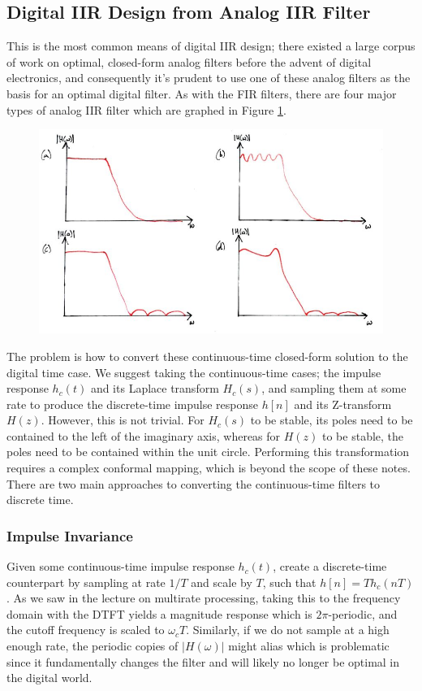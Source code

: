 \subsection{Digital IIR Design from Analog IIR Filter}
%
This is the most common means of digital IIR design; there existed a large
corpus of work on optimal, closed-form analog filters before the advent of digital
electronics, and consequently it's prudent to use one of these analog
filters as the basis for an optimal digital filter. As with the
FIR filters, there are four major types of analog IIR filter which are
graphed in Figure \ref{fig::lecture_18_analog_filters}.\\
%
\begin{figure}[!htb]
  \includegraphics[width=\textwidth]{images/lecture_18_analog_filters.JPG}
  \caption{
  }
  \label{fig::lecture_18_analog_filters}
\end{figure}
%
The problem is how to convert these continuous-time closed-form solution to
the digital time case. We suggest taking the continuous-time cases;
the impulse response $h_c(t)$ and its Laplace transform $H_c(s)$, and
sampling them at some rate to produce the discrete-time impulse response
$h[n]$ and its Z-transform $H(z)$. However, this is not trivial. For
$H_c(s)$ to be stable, its poles need to be contained to the left of the
imaginary axis, whereas for $H(z)$ to be stable, the poles need to be
contained within the unit circle. Performing this transformation requires
a complex conformal mapping, which is beyond the scope of these notes.\\
%
There are two main approaches to converting the continuous-time filters
to discrete time.

\subsubsection{Impulse Invariance}
%
Given some continuous-time impulse response $h_c(t)$, create a discrete-time
counterpart by sampling at rate $1/T$ and scale by $T$, such that
$h[n] = Th_c(nT)$. As we saw in the lecture on multirate processing, taking
this to the frequency domain with the DTFT yields a magnitude response which
is $2\pi$-periodic, and the cutoff frequency is scaled to $\omega_c T$.
Similarly, if we do not sample at a high enough rate, the periodic copies of
$|H(\omega)|$ might alias which is problematic since it fundamentally changes
the filter and will likely no longer be optimal in the digital world.

